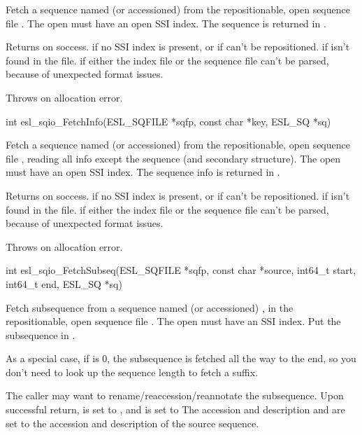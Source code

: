 \begin{sreapi}
Fetch a sequence named (or accessioned)  from
the repositionable, open sequence file .
The open  must have an open SSI index.
The sequence is returned in .

Returns  on soccess.
 if no SSI index is present, or if  can't
be repositioned.
 if  isn't found in the file.
 if either the index file or the sequence file
can't be parsed, because of unexpected format issues.

Throws  on allocation error.


\hypertarget{func:esl_sqio_FetchInfo()}
{\item[int esl\_sqio\_FetchInfo(ESL\_SQFILE *sqfp, const char *key, ESL\_SQ *sq)]}

Fetch a sequence named (or accessioned)  from
the repositionable, open sequence file , reading
all info except the sequence (and secondary structure).
The open  must have an open SSI index.
The sequence info is returned in .

Returns  on soccess.
 if no SSI index is present, or if  can't
be repositioned.
 if  isn't found in the file.
 if either the index file or the sequence file
can't be parsed, because of unexpected format issues.

Throws  on allocation error.


\hypertarget{func:esl_sqio_FetchSubseq()}
{\item[int esl\_sqio\_FetchSubseq(ESL\_SQFILE *sqfp, const char *source, int64\_t start, int64\_t end, ESL\_SQ *sq)]}

Fetch subsequence  from a sequence named (or
accessioned) , in the repositionable, open sequence file .
The open  must have an SSI index. Put the
subsequence in . 

As a special case, if  is 0, the subsequence is
fetched all the way to the end, so you don't need to
look up the sequence length  to fetch a suffix.

The caller may want to rename/reaccession/reannotate the
subsequence.  Upon successful return,  is set
to , and  is set to
 The accession and description  and
 are set to the accession and description of
the source sequence.


\end{sreapi}

